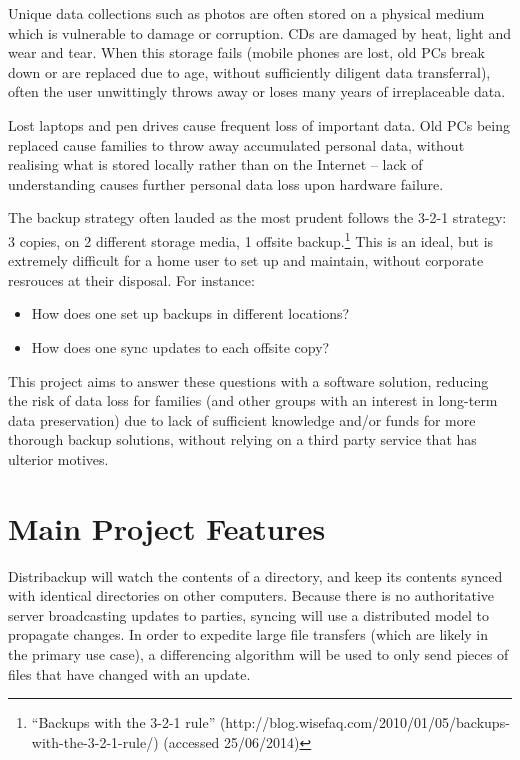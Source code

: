 \documentclass[12pt,a4paper,]{adreport}
\begin{document}
Unique data collections such as photos are often stored on a physical
medium which is vulnerable to damage or corruption. CDs are damaged by
heat, light and wear and tear. When this storage fails (mobile phones
are lost, old PCs break down or are replaced due to age, without
sufficiently diligent data transferral), often the user unwittingly
throws away or loses many years of irreplaceable data.

Lost laptops and pen drives cause frequent loss of important data. Old
PCs being replaced cause families to throw away accumulated personal
data, without realising what is stored locally rather than on the
Internet -- lack of understanding causes further personal data loss upon
hardware failure.

The backup strategy often lauded as the most prudent follows the 3-2-1
strategy: 3 copies, on 2 different storage media, 1 offsite
backup.\footnote{``Backups with the 3-2-1 rule''
  (http://blog.wisefaq.com/2010/01/05/backups-with-the-3-2-1-rule/)
  (accessed 25/06/2014)} This is an ideal, but is extremely difficult
for a home user to set up and maintain, without corporate resrouces at
their disposal. For instance:

\begin{itemize}
\itemsep1pt\parskip0pt
\item
  How does one set up backups in different locations?
\item
  How does one sync updates to each offsite copy?
\end{itemize}

This project aims to answer these questions with a software solution,
reducing the risk of data loss for families (and other groups with an
interest in long-term data preservation) due to lack of sufficient
knowledge and/or funds for more thorough backup solutions, without
relying on a third party service that has ulterior motives.

\section{Main Project Features}\label{main-project-features}

Distribackup will watch the contents of a directory, and keep its
contents synced with identical directories on other computers. Because
there is no authoritative server broadcasting updates to parties,
syncing will use a distributed model to propagate changes. In order to
expedite large file transfers (which are likely in the primary use
case), a differencing algorithm will be used to only send pieces of
files that have changed with an update.
\end{document}
